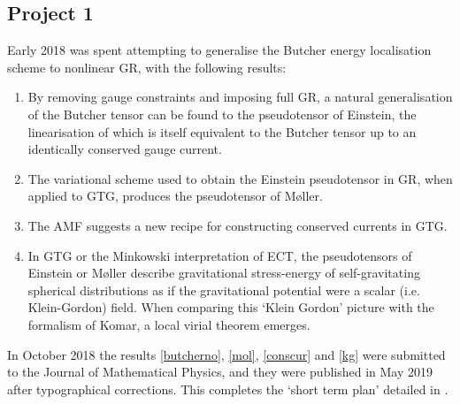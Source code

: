 \documentclass[twoside]{report}
\begin{document}
\begin{multicols}{2}
\subsection{Project 1}\label{pr1}
Early 2018 was spent attempting to generalise the Butcher energy localisation scheme \cite{2014JPhCS.484a2011B,2012PhRvD..86h4012B,2012PhRvD..86h4013B} to nonlinear GR, with the following results:
\begin{enumerate}[resume]
  \item\label{butcherno} By removing gauge constraints and imposing full GR, a natural generalisation of the Butcher tensor can be found to the pseudotensor of Einstein, the linearisation of which is itself equivalent to the Butcher tensor up to an identically conserved gauge current.
  \item\label{mol} The variational scheme used to obtain the Einstein pseudotensor in GR, when applied to GTG, produces the pseudotensor of M{\o}ller.
  \item\label{conscur} The AMF suggests a new recipe for constructing conserved currents in GTG.
  \item\label{kg} In GTG or the Minkowski interpretation of ECT, the pseudotensors of Einstein or M{\o}ller describe gravitational stress-energy of self-gravitating spherical distributions as if the gravitational potential were a scalar (i.e. Klein-Gordon) field. When comparing this `Klein Gordon' picture with the formalism of Komar, a local virial theorem emerges. 
\end{enumerate}
In October 2018 the results \ref{butcherno}, \ref{mol}, \ref{conscur} and \ref{kg} were submitted to the Journal of Mathematical Physics, and they were published \cite{2019JMP....60e2504B} in May 2019 after typographical corrections. This completes the `short term plan' detailed in \cite{lg}.

\end{multicols}
\end{document}

